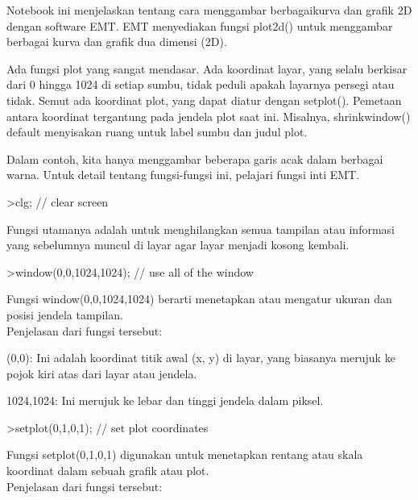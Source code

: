 \documentclass[a4paper,10pt]{article}
\begin{document}
\begin{eulernotebook}
\begin{eulercomment}
Notebook ini menjelaskan tentang cara menggambar berbagaikurva dan
grafik 2D dengan software EMT. EMT menyediakan fungsi plot2d() untuk
menggambar berbagai kurva dan grafik dua dimensi (2D).\\
\end{eulercomment}
\begin{eulercomment}
Ada fungsi plot yang sangat mendasar. Ada koordinat layar, yang selalu
berkisar dari 0 hingga 1024 di setiap sumbu, tidak peduli apakah
layarnya persegi atau tidak. Semut ada koordinat plot, yang dapat
diatur dengan setplot(). Pemetaan antara koordinat tergantung pada
jendela plot saat ini. Misalnya, shrinkwindow() default menyisakan
ruang untuk label sumbu dan judul plot.


Dalam contoh, kita hanya menggambar beberapa garis acak dalam berbagai
warna. Untuk detail tentang fungsi-fungsi ini, pelajari fungsi inti
EMT.
\end{eulercomment}
\begin{eulerprompt}
>clg; // clear screen
\end{eulerprompt}
\begin{eulercomment}
Fungsi utamanya adalah untuk menghilangkan semua tampilan atau
informasi yang sebelumnya muncul di layar agar layar menjadi kosong
kembali.
\end{eulercomment}
\begin{eulerprompt}
>window(0,0,1024,1024); // use all of the window
\end{eulerprompt}
\begin{eulercomment}
Fungsi window(0,0,1024,1024) berarti menetapkan atau mengatur ukuran
dan posisi jendela tampilan.\\
Penjelasan dari fungsi tersebut:

(0,0): Ini adalah koordinat titik awal (x, y) di layar, yang biasanya
merujuk ke pojok kiri atas dari layar atau jendela.

1024,1024: Ini merujuk ke lebar dan tinggi jendela dalam piksel.
\end{eulercomment}
\begin{eulerprompt}
>setplot(0,1,0,1); // set plot coordinates
\end{eulerprompt}
\begin{eulercomment}
Fungsi setplot(0,1,0,1) digunakan untuk menetapkan rentang atau skala
koordinat dalam sebuah grafik atau plot.\\
Penjelasan dari fungsi tersebut:


\end{eulercomment}
\end{eulernotebook}
\end{document}

